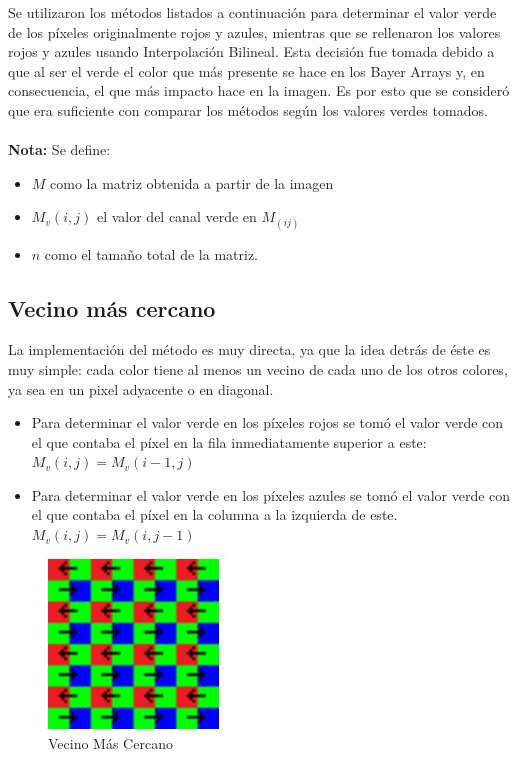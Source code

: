 \documentclass[a4paper]{article}
\begin{document}
Se utilizaron los métodos listados a continuación para determinar el valor verde de los píxeles originalmente rojos y azules, mientras que se rellenaron los valores rojos y azules usando Interpolación Bilineal. Esta decisión fue tomada debido a que al ser el verde el color que más presente se hace en los Bayer Arrays y, en consecuencia, el que más impacto hace en la imagen. Es por esto que se consideró que era suficiente con comparar los métodos según los valores verdes tomados.\\ \\ %
\textbf{Nota:} Se define:
\begin{itemize}
\item $M$ como la matriz obtenida a partir de la imagen
\item $M_v(i,j)$ el valor del canal verde en $M_(ij)$

\item $n$ como el tamaño total de la matriz.
\end{itemize}

\subsection {Vecino más cercano}
La implementación del método es muy directa, ya que la idea detrás de éste es muy simple: cada color tiene al menos un vecino de cada uno de los otros colores, ya sea en un pixel adyacente o en diagonal.\\

\begin{itemize}
\item Para determinar el valor verde en los píxeles rojos se tomó el valor verde con el que contaba el píxel en la fila inmediatamente superior a este:\\
$M_{v}(i,j) = M_{v}(i-1,j)$\\

\item Para determinar el valor verde en los píxeles azules se tomó el valor verde con el que contaba el píxel en la columna a la izquierda de este.\\
$M_{v}(i,j) = M_{v}(i,j-1)$\\

\end{itemize}

\begin{figure}[htbp]
\centering
\includegraphics[width=128pt]{img/BA0.png}       %
\caption{Vecino Más Cercano}
\end{figure}
\end{document}

